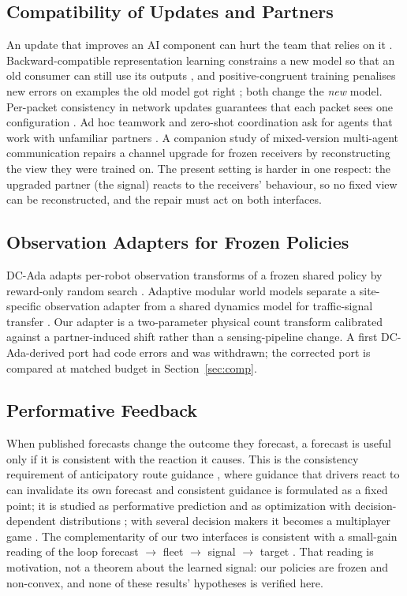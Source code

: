 \subsection{Compatibility of Updates and Partners}
An update that improves an AI component can hurt the team that relies on it \cite{bansal2019}. Backward-compatible representation
learning constrains a new model so that an old consumer can still use its outputs \cite{shen2020}, and positive-congruent training
penalises new errors on examples the old model got right \cite{yan2021}; both change the \emph{new} model. Per-packet consistency in
network updates guarantees that each packet sees one configuration \cite{reitblatt2012}. Ad hoc teamwork and zero-shot coordination ask
for agents that work with unfamiliar partners \cite{stone2010,hu2020}. A companion study of mixed-version multi-agent communication
\cite{nguyen2026legacy} repairs a channel upgrade for frozen receivers by reconstructing the view they were trained on. The present setting
is harder in one respect: the upgraded partner (the signal) reacts to the receivers' behaviour, so no fixed view can be reconstructed, and
the repair must act on both interfaces.

\subsection{Observation Adapters for Frozen Policies}
DC-Ada adapts per-robot observation transforms of a frozen shared policy by reward-only random search \cite{alqithami2026}. Adaptive
modular world models separate a site-specific observation adapter from a shared dynamics model for traffic-signal transfer
\cite{huang2026}. Our adapter is a two-parameter physical count transform calibrated against a partner-induced shift rather than a
sensing-pipeline change. A first DC-Ada-derived port had code errors and was withdrawn; the corrected port is compared at matched budget in Section~\ref{sec:comp}.

\subsection{Performative Feedback}
When published forecasts change the outcome they forecast, a forecast is useful only if it is consistent with the reaction it causes. This
is the consistency requirement of anticipatory route guidance \cite{bottom2000}, where guidance that drivers react to can invalidate its own
forecast and consistent guidance is formulated as a fixed point; it is studied as performative prediction \cite{perdomo2020} and
as optimization with decision-dependent distributions \cite{drusvyatskiy2023}; with several decision makers it becomes a multiplayer game
\cite{narang2023}. The complementarity of our two interfaces is consistent with a small-gain reading of the loop forecast $\to$ fleet
$\to$ signal $\to$ target \cite{jiang1994,dashkovskiy2007}. That reading is motivation, not a theorem about the learned signal: our
policies are frozen and non-convex, and none of these results' hypotheses is verified here.

